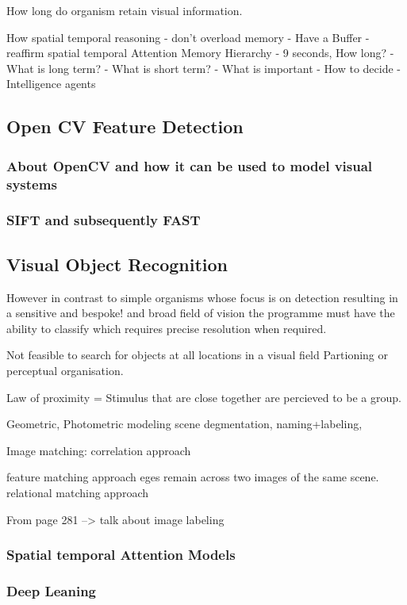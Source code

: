 \documentclass{mproj}
\begin{document}
How long do organism retain visual information.

How spatial temporal reasoning
- don't overload memory
- Have a Buffer
- reaffirm spatial temporal Attention
Memory Hierarchy
- 9 seconds, How long?
- What is long term?
- What is short term? 
- What is important
- How to decide
- Intelligence agents

\subsection{Open CV Feature Detection}
\subsubsection{About OpenCV and how it can be used to model visual systems}
\subsubsection{SIFT and subsequently FAST}

\subsection{Visual Object Recognition}

However in contrast to simple organisms whose focus is on detection resulting in a sensitive and bespoke! and broad field of vision the programme must have the ability to classify which requires precise resolution when required.

Not feasible to search for objects at all locations in a visual field
Partioning or perceptual organisation.

Law of proximity = Stimulus that are close together are percieved to be a group.

Geometric, Photometric modeling scene degmentation, naming+labeling,

Image matching:
correlation approach
 
feature matching approach
eges remain across two images of the same scene. 
relational matching approach

From page 281 --> talk about image labeling

\subsubsection{Spatial temporal Attention Models}
\subsubsection{Deep Leaning}
\end{document}
